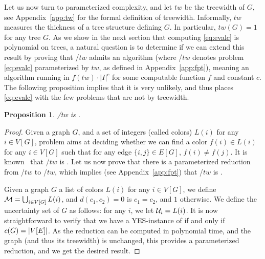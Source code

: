 \documentclass[12pt]{article}
\newtheorem{proposition}{Proposition}
\newcommand{\blue}[1]{{\color{black}#1}}
\begin{document}
Let us now turn to parameterized complexity,  and let $tw$ be the treewidth of $G$, see Appendix~\ref{app:tw} for the formal definition of treewidth. Informally, $tw$
measures the thickness of a tree structure defining $G$.
In particular, $tw(G)=1$ for any tree $G$.
As we show in the next section that computing \ref{eq:evalc} is polynomial on trees, a natural
question is to determine if we can extend this result by proving that \EVALC/$tw$ admits an \FPT algorithm (where \EVALC/$tw$ denotes problem \ref{eq:evalc} parameterized by $tw$, as defined
in Appendix~\ref{app:fpt}), meaning an algorithm running in $f(tw)\cdot |I|^c$ for some computable function $f$ and constant $c$.
The following proposition implies that it is very unlikely, and thus places \ref{eq:evalc} with the few problems that are not \FPT by treewidth. 
\begin{proposition}\label{prop:w1tw}
\EVALC/tw is \WONEH.
\end{proposition}
\begin{proof}
  Given a graph $G$, and a set of integers (called colors) $L(i)$ for any $i \in V[G]$, problem \LISTCOL aims at deciding whether we can find a color $f(i) \in L(i)$ for any $i \in V[G]$ such that for any edge $\{i,j\} \in E[G]$, $f(i) \neq f(j)$.
  It is known~\cite{fellows2011complexity} that \LISTCOL/$tw$ is \WONEH. Let us now prove that there is a parameterized reduction from \LISTCOL/$tw$ to \EVALC/$tw$,
  which implies (see Appendix~\ref{app:fpt}) that \EVALC/$tw$ is \WONEH.

Given a graph $G$ a list of colors $L(i)$ for any $i \in V[G]$, we define $\mathcal{M}=\bigcup_{i \in V[G]}L(i)$, and $d(c_1,c_2)=0$ is $c_1=c_2$, and $1$ otherwise.
We define the uncertainty set of $G$ as follows: for any $i$, we let $\mathcal{U}_i = L(i)$.
It is now straightforward to verify that we have a YES-instance of \LISTCOL if and only if $\cost(G)=\blue{|V[E]|}$. As the reduction can be computed in polynomial time, and the graph (and thus its treewidth) is unchanged, this provides a parameterized reduction, and we get the desired result.
\end{proof}
\end{document}
